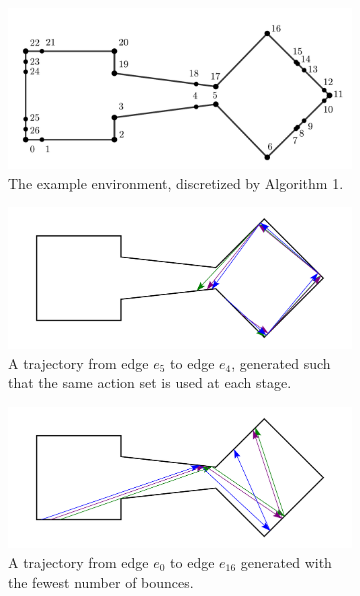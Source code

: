 \documentclass[sageh,times,Review]{sagej}
\begin{document}
\begin{figure}
\centering
\begin{subfigure}{0.8\columnwidth}
\includegraphics[width=\linewidth]{sort_inserted.pdf}
\caption{The example environment, discretized by Algorithm 1. \label{fig:example_env}}
\end{subfigure}
\begin{subfigure}{0.5\columnwidth}
\includegraphics[width=\linewidth]{escape_room.pdf}
\caption{A trajectory from edge $e_5$ to edge $e_4$, generated such that the same action set is used at each
stage. \label{fig:constant}}
\end{subfigure}%
\begin{subfigure}{0.5\columnwidth}
\includegraphics[width=\linewidth]{short_path.pdf}
\caption{A trajectory from edge $e_0$ to edge $e_16$ generated with the fewest number of bounces.
\label{fig:short}}
\end{subfigure}
\caption{\label{fig:examples}}
\end{figure}
\end{document}
